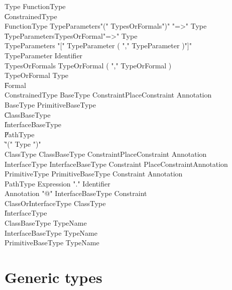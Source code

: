 \begin{grammar}
Type \: FunctionType \\
    \| ConstrainedType  \\

FunctionType \: TypeParameters\opt \xcd"(" TypesOrFormals\opt \xcd")" \xcd"=>" Type  \\
             \| TypeParameters\opt TypesOrFormal\opt \xcd"=>" Type  \\
TypeParameters \: \xcd"[" TypeParameter ( \xcd"," TypeParameter )\star \xcd"]" \\
TypeParameter \: Identifier \\
TypesOrFormals \: TypeOrFormal ( \xcd"," TypeOrFormal )\star \\
TypeOrFormal   \: Type \\
               \| Formal \\

ConstrainedType \: BaseType Constraint\opt PlaceConstraint\opt
Annotation\star \\

BaseType \: PrimitiveBaseType \\
     \| ClassBaseType \\
     \| InterfaceBaseType \\
     \| PathType \\
     \| \xcd"(" Type \xcd")" \\

ClassType \: ClassBaseType Constraint\opt PlaceConstraint\opt
Annotation\star \\
InterfaceType \: InterfaceBaseType Constraint\opt
PlaceConstraint\opt Annotation\star \\
PrimitiveType \: PrimitiveBaseType Constraint\opt
Annotation\star \\

PathType \: Expression \xcd"." Identifier \\

Annotation \: \xcd"@" InterfaceBaseType Constraint\opt \\

ClassOrInterfaceType \: ClassType \\ \| InterfaceType \\
ClassBaseType \: TypeName \\
InterfaceBaseType \: TypeName \\
PrimitiveBaseType \: TypeName \\
\end{grammar}

\section{Generic types}
\label{Generics}

